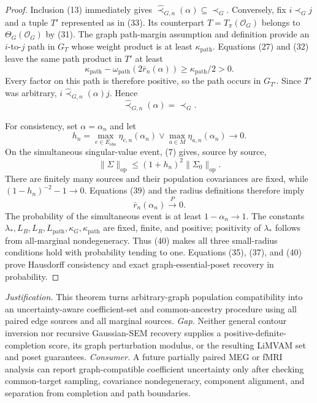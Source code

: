 \documentclass{article}
\begin{document}
\begin{proof}
Inclusion (13) immediately gives \(\widehat\prec_{G,n}(\alpha)\subseteq\prec_G\).  Conversely, fix \(i\prec_Gj\) and a tuple \(T'\) represented as in (33).  Its counterpart \(T=T_\pi(\mathcal O_G)\) belongs to \(\Theta_G(\mathcal O_G)\) by (31).  The graph path-margin assumption and definition provide an \(i\)-to-\(j\) path in \(G_T\) whose weight product is at least \(\kappa_{\mathrm{path}}\).  Equations (27) and (32) leave the same path product in \(T'\) at least
\[
\kappa_{\mathrm{path}}-
\omega_{\mathrm{path}}(2\bar r_n(\alpha))
\ge\kappa_{\mathrm{path}}/2>0.
\tag{36}
\]
Every factor on this path is therefore positive, so the path occurs in \(G_{T'}\).  Since \(T'\) was arbitrary, \(i\widehat\prec_{G,n}(\alpha)j\).  Hence
\[
\widehat\prec_{G,n}(\alpha)=\prec_G.
\tag{37}
\]

For consistency, set \(\alpha=\alpha_n\) and let
\[
h_n=\max_{e\in E_{\mathrm{obs}}}\eta_{e,n}(\alpha_n)
\vee\max_{a\in M}\eta_{a,n}(\alpha_n)\longrightarrow0.
\tag{38}
\]
On the simultaneous singular-value event, (7) gives, source by source,
\[
\|\widehat\Sigma\|_{\mathrm{op}}
\le(1+h_n)^2\|\Sigma_0\|_{\mathrm{op}}.
\tag{39}
\]
There are finitely many sources and their population covariances are fixed, while \((1-h_n)^{-2}-1\to0\).  Equations (39) and the radius definitions therefore imply
\[
\bar r_n(\alpha_n)\xrightarrow{P}0.
\tag{40}
\]
The probability of the simultaneous event is at least \(1-\alpha_n\to1\).  The constants \(\lambda_*,L_B,L_R,L_{\mathrm{path}},\kappa_G,\kappa_{\mathrm{path}}\) are fixed, finite, and positive; positivity of \(\lambda_*\) follows from all-marginal nondegeneracy.  Thus (40) makes all three small-radius conditions hold with probability tending to one.  Equations (35), (37), and (40) prove Hausdorff consistency and exact graph-essential-poset recovery in probability.
\end{proof}
\par\smallskip\noindent \textit{Justification.} This theorem turns arbitrary-graph population compatibility into an uncertainty-aware coefficient-set and common-ancestry procedure using all paired edge sources and all marginal sources. \textit{Gap.} Neither general contour inversion nor recursive Gaussian-SEM recovery supplies a positive-definite-completion score, its graph perturbation modulus, or the resulting LiMVAM set and poset guarantees. \textit{Consumer.} A future partially paired MEG or fMRI analysis can report graph-compatible coefficient uncertainty only after checking common-target sampling, covariance nondegeneracy, component alignment, and separation from completion and path boundaries.
\end{document}
